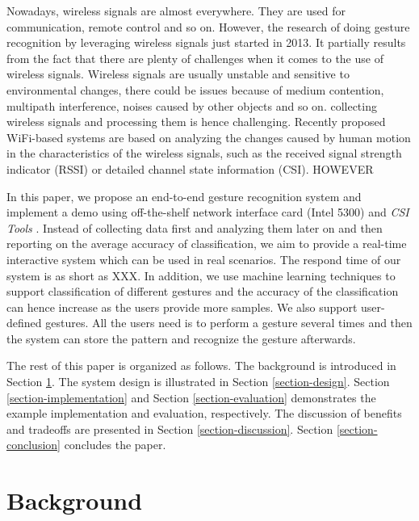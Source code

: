\documentclass[conference]{IEEEtran}
\begin{document}
Nowadays, wireless signals are almost everywhere. They are used for communication, remote control and so on. However, the research of doing gesture recognition by leveraging wireless signals just started in 2013. It partially results from the fact that there are plenty of challenges when it comes to the use of wireless signals. 
Wireless signals are usually unstable and sensitive to environmental changes, there could be issues because of medium contention, multipath interference, noises caused by other objects and so on.
collecting wireless signals and processing them is hence challenging.
Recently proposed WiFi-based systems are based on analyzing the changes caused by human motion in the characteristics of the wireless signals, such as the received signal strength indicator (RSSI) or detailed channel state information (CSI). HOWEVER

In this paper, we propose an end-to-end gesture recognition system and implement a demo using off-the-shelf network interface card (Intel 5300) and \emph{CSI Tools} \cite{halperin2011tool}. 
Instead of collecting data first and analyzing them later on and then reporting on the average accuracy of classification, we aim to provide a real-time interactive system which can be used in real scenarios. 
The respond time of our system is as short as XXX. 
In addition, we use machine learning techniques to support classification of different gestures and the accuracy of the classification can hence increase as the users provide more samples.
We also support user-defined gestures. All the users need is to perform a gesture several times and then the system can store the pattern and recognize the gesture afterwards.

The rest of this paper is organized as follows.  The background is introduced in Section \ref{section-background}. The system design is illustrated in Section \ref{section-design}. Section \ref{section-implementation} and Section \ref{section-evaluation} demonstrates the example implementation and evaluation, respectively. The discussion of benefits and tradeoffs are presented in Section \ref{section-discussion}. Section \ref{section-conclusion} concludes the paper.

\section{Background} \label{section-background}
\end{document}
